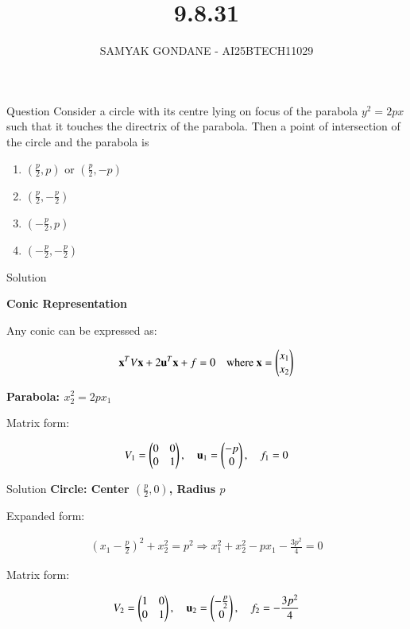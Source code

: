 \documentclass{beamer}
\title 
{9.8.31}
\date{}
\author
{SAMYAK GONDANE - AI25BTECH11029}
\begin{document}
\frame{\titlepage}

\begin{frame}{Question}
Consider a circle with its centre lying on focus of the parabola $y^2 = 2px$ such that it touches the directrix of the parabola. Then a point of intersection of the circle and the parabola is

\begin{multicols}{2}
\begin{enumerate}
    \item $(\frac{p}{2}, p)$ or $(\frac{p}{2}, -p)$
    \item $(\frac{p}{2}, -\frac{p}{2})$
    \item $(-\frac{p}{2}, p)$
    \item $(-\frac{p}{2}, -\frac{p}{2})$
\end{enumerate}
\end{multicols}

\end{frame}

\begin{frame}{Solution}

\textbf{Conic Representation}

Any conic can be expressed as:


\begin{align}
\mathbf{x}^T V \mathbf{x} + 2 \mathbf{u}^T \mathbf{x} + f = 0
\quad \text{where } \mathbf{x} = \begin{pmatrix}x_1 \\ x_2\end{pmatrix}
\end{align}

\textbf{Parabola: $x_2^2 = 2p x_1$}

Matrix form:

\begin{align}
V_1 = \begin{pmatrix}0 & 0 \\ 0 & 1\end{pmatrix}, \quad
\mathbf{u}_1 = \begin{pmatrix}-p \\ 0\end{pmatrix}, \quad
f_1 = 0
\end{align}
\end{frame}


\begin{frame}{Solution}
\textbf{Circle: Center $(\frac{p}{2}, 0)$, Radius $p$}

Expanded form:


\begin{align}
(x_1 - \frac{p}{2})^2 + x_2^2 = p^2
\Rightarrow x_1^2 + x_2^2 - p x_1 - \frac{3p^2}{4} = 0
\end{align}



Matrix form:


\begin{align}
V_2 = \begin{pmatrix}1 & 0 \\ 0 & 1\end{pmatrix}, \quad
\mathbf{u}_2 = \begin{pmatrix}-\frac{p}{2} \\ 0\end{pmatrix}, \quad
f_2 = -\frac{3p^2}{4}
\end{align}
\end{frame}
\end{document}
